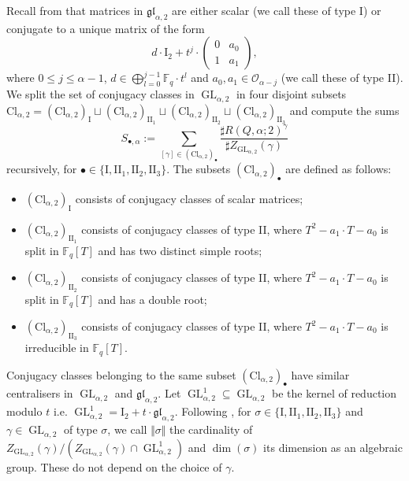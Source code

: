 \documentclass[11pt,english]{article}
\numberwithin{equation}{section}
\numberwithin{figure}{section}
\theoremstyle{definition}
\theoremstyle{plain}
\theoremstyle{remark}
\DeclareMathOperator{\GL}{GL}
\newcommand\FF{\mathbb{F}}
\begin{document}
Recall from \cite[\S 2]{AOPV09} that matrices in $\mathfrak{gl}_{\alpha,2}$
are either scalar (we call these of type I) or conjugate to a unique
matrix of the form \[
d\cdot\mathrm{I}_2+t^j\cdot
\left(
\begin{array}{cc}
0 & a_0 \\
1 & a_1
\end{array}
\right),
\] where $0\leq j\leq\alpha-1$, $d\in\bigoplus_{l=0}^{j-1}\FF_{q}\cdot t^{l}$
and $a_{0},a_{1}\in\mathcal{O}_{\alpha-j}$ (we call these of type
II). We split the set of conjugacy classes in $\GL_{\alpha,2}$ in
four disjoint subsets $\mathrm{Cl}_{\alpha,2}=(\mathrm{Cl}_{\alpha,2})_{\mathrm{I}}\sqcup(\mathrm{Cl}_{\alpha,2})_{\mathrm{II_{1}}}\sqcup(\mathrm{Cl}_{\alpha,2})_{\mathrm{II_{2}}}\sqcup(\mathrm{Cl}_{\alpha,2})_{\mathrm{II_{3}}}$
and compute the sums\[
S_{\bullet,\alpha}:=\sum_{[\gamma]\in(\mathrm{Cl}_{\alpha,2})_{\bullet}}\frac{\sharp R(Q,\alpha;2)^{\gamma}}{\sharp Z_{\GL_{\alpha,2}}(\gamma)}
\] recursively, for $\bullet\in\{\mathrm{I},\mathrm{II}_{1},\mathrm{II}_{2},\mathrm{II}_{3}\}$.
The subsets $(\mathrm{Cl}_{\alpha,2})_{\bullet}$ are defined as follows:
\begin{itemize}
\item $(\mathrm{Cl}_{\alpha,2})_{\mathrm{I}}$ consists of conjugacy classes
of scalar matrices;
\item $(\mathrm{Cl}_{\alpha,2})_{\mathrm{II_{1}}}$ consists of conjugacy
classes of type II, where $T^{2}-a_{1}\cdot T-a_{0}$ is split in
$\FF_{q}[T]$ and has two distinct simple roots;
\item $(\mathrm{Cl}_{\alpha,2})_{\mathrm{II_{2}}}$ consists of conjugacy
classes of type II, where $T^{2}-a_{1}\cdot T-a_{0}$ is split in
$\FF_{q}[T]$ and has a double root;
\item $(\mathrm{Cl}_{\alpha,2})_{\mathrm{II_{3}}}$ consists of conjugacy
classes of type II, where $T^{2}-a_{1}\cdot T-a_{0}$ is irreducible
in $\FF_{q}[T]$.
\end{itemize}
Conjugacy classes belonging to the same subset $(\mathrm{Cl}_{\alpha,2})_{\bullet}$
have similar centralisers in $\GL_{\alpha,2}$ and $\mathfrak{gl}_{\alpha,2}$.
Let $\GL_{\alpha,2}^{1}\subseteq\GL_{\alpha,2}$ be the kernel of
reduction modulo $t$ i.e. $\GL_{\alpha,2}^{1}=\mathrm{I}_{2}+t\cdot\mathfrak{gl}_{\alpha,2}$.
Following \cite[\S 2.1.]{AKOV16}, for $\sigma\in\{\mathrm{I},\mathrm{II}_{1},\mathrm{II}_{2},\mathrm{II}_{3}\}$
and $\gamma\in\GL_{\alpha,2}$ of type $\sigma$, we call $\Vert\sigma\Vert$
the cardinality of $Z_{\GL_{\alpha,2}}(\gamma)/\left(Z_{\GL_{\alpha,2}}(\gamma)\cap\GL_{\alpha,2}^{1}\right)$
and $\dim(\sigma)$ its dimension as an algebraic group. These do
not depend on the choice of $\gamma$.
\end{document}
